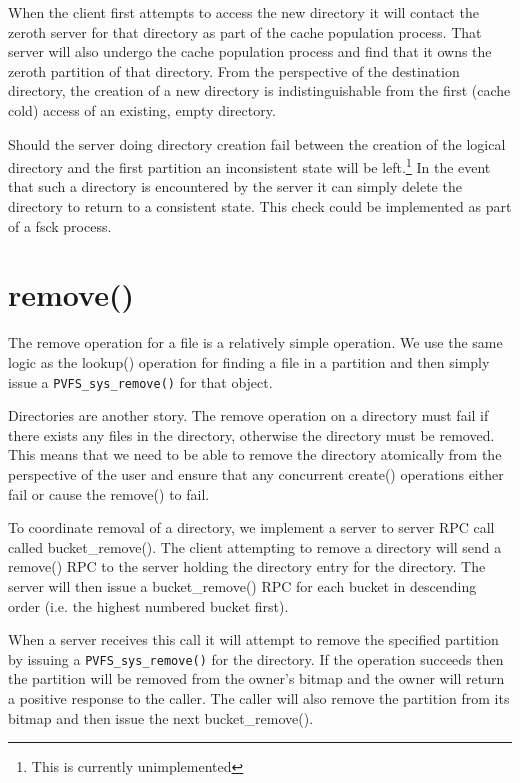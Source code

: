 \documentclass[letterpaper]{article}
\newcommand{\code}[1]{\texttt{#1}}
\begin{document}
When the client first attempts to access the new directory it will contact the
zeroth server for that directory as part of the cache population process.  That
server will also undergo the cache population process and find that it owns the
zeroth partition of that directory.  From the perspective of the destination
directory, the creation of a new directory is indistinguishable from the first
(cache cold) access of an existing, empty directory.

Should the server doing directory creation fail between the creation of the
logical directory and the first partition an inconsistent state will be
left.\footnote{This is currently unimplemented}  In the event that such a
directory is encountered by the server it can simply delete the directory to
return to a consistent state.  This check could be implemented as part of a
fsck process.

\section{remove()}
The remove operation for a file is a relatively simple operation.  We use the
same logic as the lookup() operation for finding a file in a partition and then
simply issue a \code{PVFS\_\-sys\_\-remove()} for that object.

Directories are another story.  The remove operation on a directory must fail if
there exists any files in the directory, otherwise the directory must be
removed.  This means that we need to be able to remove the directory
atomically from the perspective of the user and ensure that any concurrent
create() operations either fail or cause the remove() to fail.

To coordinate removal of a directory, we implement a server to server RPC call
called bucket\_\-remove().  The client attempting to remove a directory will send a
remove() RPC to the server holding the directory entry for the directory.  The
server will then issue a bucket\_\-remove() RPC for each bucket in descending order
(i.e. the highest numbered bucket first).  

When a server receives this call it will attempt to remove the specified
partition by issuing a \code{PVFS\_\-sys\_\-remove()} for the directory.  If the operation
succeeds then the partition will be removed from the owner's bitmap and the
owner will return a positive response to the caller.  The caller will also
remove the partition from its bitmap and then issue the next bucket\_\-remove().
\end{document}
